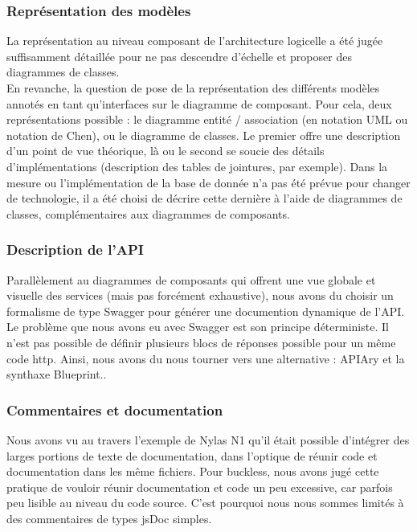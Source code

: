     \subsubsection{Représentation des modèles}
        La représentation au niveau composant de l'architecture logicelle a été jugée suffisamment
        détaillée pour ne pas descendre d'échelle et proposer des diagrammes de classes.\\
        En revanche, la question de pose de la représentation des différents modèles annotés en tant
        qu'interfaces sur le diagramme de composant. Pour cela, deux représentations possible :
        le diagramme entité / association (en notation UML ou notation de Chen), ou le diagramme de
        classes. Le premier offre une description d'un point de vue théorique, là ou le second se
        soucie des détails d'implémentations (description des tables de jointures, par exemple).
        Dans la mesure ou l'implémentation de la base de donnée n'a pas été prévue pour changer de
        technologie, il a été choisi de décrire cette dernière à l'aide de diagrammes de classes,
        complémentaires aux diagrammes de composants.

    \subsubsection{Description de l'API}
        Parallèlement au diagrammes de composants qui offrent une vue globale et visuelle des services
        (mais pas forcément exhaustive), nous avons du choisir un formalisme de type Swagger pour
        générer une documention dynamique de l'API.\\
        Le problème que nous avons eu avec Swagger est son principe déterministe\cite{determinism}.
        Il n'est pas possible de définir plusieurs blocs de réponses possible pour un même code http.
        Ainsi, nous avons du nous tourner vers une alternative : APIAry et la synthaxe Blueprint..

    \subsubsection{Commentaires et documentation}
        Nous avons vu au travers l'exemple de Nylas N1 qu'il était possible d'intégrer des larges
        portions de texte de documentation, dans l'optique de réunir code et documentation dans les
        même fichiers. Pour buckless, nous avons jugé cette pratique de vouloir réunir documentation
        et code un peu excessive, car parfois peu lisible au niveau du code source.
        C'est pourquoi nous nous sommes limités à des commentaires de types jsDoc simples.

